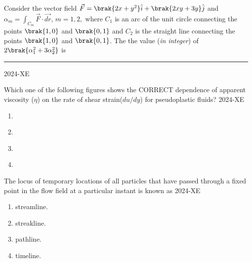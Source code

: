 	
	\item Consider the vector field $\vec{F}=\brak{2x+y^2}\hat{i} + \brak{2xy+3y}\hat{j}$ and $\alpha_m =\int _{C_m} \vec{F} \cdot \vec{dr}$, $m=1,2,$ where $C_1$ is an arc of the unit circle connecting the points $\brak{1,0}$ and $\brak{0,1}$ and $C_2$ is the straight line connecting the points $\brak{1,0}$ and $\brak{0,1}$. The the value (\textit{in integer}) of $2\brak{\alpha_1 ^2 +3\alpha_2 ^2}$ is \rule{1cm}{0.2pt}
	\hfill{2024-XE}




	\item Which one of the following figures shows the CORRECT dependence of apparent viscosity ($\eta$) on the rate of shear strain($du/dy$) for pseudoplastic fluids?
	\hfill{2024-XE}

		\begin{enumerate}
			\item %
				\begin{figure}[ht]
					
				\end{figure}
			\item %
				\begin{figure}[ht]
					
				\end{figure}

			\item %
				\begin{figure}[ht]
					
				\end{figure}

			\item %
				\begin{figure}[ht]
					
				\end{figure}

		\end{enumerate}

	\item The locus of temporary locations of all particles that have passed through a fixed point in the flow field at a particular instant is known as 
	\hfill{2024-XE}

		\begin{enumerate}
			\item streamline.
			\item streakline.
			\item pathline.
			\item timeline.
		\end{enumerate}
		
